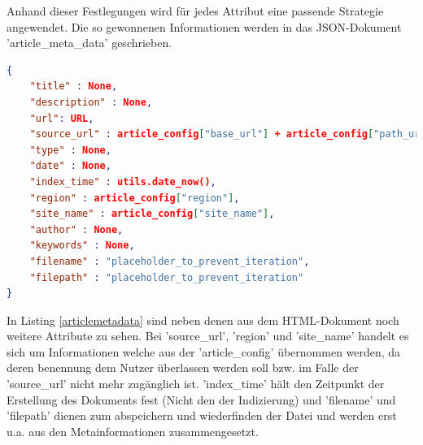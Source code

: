 \documentclass[12pt,oneside,a4paper,parskip]{scrbook}
\begin{document}
Anhand dieser Festlegungen wird für jedes Attribut eine passende Strategie angewendet. Die so gewonnenen Informationen werden in das JSON-Dokument 'article\_meta\_data' geschrieben.
\begin{lstlisting}[caption=article\_meta\_data Dokument vor seiner Befüllung mit Daten,label=articlemetadata,language=json]
{ 	 
	"title" : None, 
	"description" : None, 
	"url": URL, 
	"source_url" : article_config["base_url"] + article_config["path_url"],  
	"type" : None, 
	"date" : None, 
	"index_time" : utils.date_now(),
	"region" : article_config["region"], 
	"site_name" : article_config["site_name"], 
	"author" : None, 
	"keywords" : None,
	"filename" : "placeholder_to_prevent_iteration",
	"filepath" : "placeholder_to_prevent_iteration"
}
\end{lstlisting}
In Listing \ref{articlemetadata} sind neben denen aus dem HTML-Dokument noch weitere Attribute zu sehen. Bei 'source\_url', 'region' und 'site\_name' handelt es sich um Informationen welche aus der 'article\_config' übernommen werden, da deren benennung dem Nutzer überlassen werden soll bzw. im Falle der 'source\_url' nicht mehr zugänglich ist. 'index\_time' hält den Zeitpunkt der Erstellung des Dokuments fest (Nicht den der Indizierung) und 'filename' und 'filepath' dienen zum abspeichern und wiederfinden der Datei und werden erst u.a. aus den Metainformationen zusammengesetzt.

\pagebreak
\end{document}
